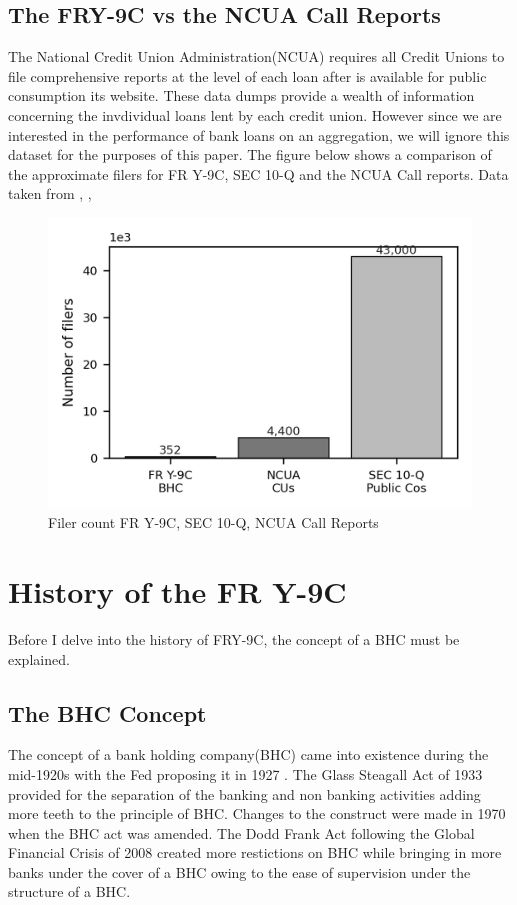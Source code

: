 \documentclass[conference]{IEEEtran}
\begin{document}
\subsection{The FRY-9C vs the NCUA Call Reports}
The National Credit Union Administration(NCUA) requires all Credit Unions to file comprehensive reports at the level of each loan after is available for public consumption its website. These data dumps provide a wealth of information concerning the invdividual loans lent by each credit union.\cite{NCUA} However since we are interested in the performance of bank loans on an aggregation, we will ignore this dataset for the purposes of this paper. The figure below shows a comparison of the approximate filers for FR Y-9C, SEC 10-Q and the NCUA Call reports. Data taken from \cite{9CCount}, \cite{SECCount},\cite{NCUACount}
\begin{figure}[htbp]
	\centerline{\includegraphics{9C Vs 10-Q Vs NCUA Grayscale.png}}
	\caption{Filer count FR Y-9C, SEC 10-Q, NCUA Call Reports}
	\label{fig}
\end{figure}

\section{History of the FR Y-9C}
Before I delve into the history of FRY-9C, the concept of a BHC must be explained.
\subsection{The BHC Concept}
 The concept of a bank holding company(BHC) came into existence during the mid-1920s with the Fed proposing it in 1927 . The Glass Steagall Act of 1933 provided for the separation of the banking and non banking activities adding more teeth to the principle of BHC. Changes to the construct were made in 1970 when the BHC act was amended. The Dodd Frank Act following the Global Financial Crisis of 2008 created more restictions on BHC while bringing in more banks under the cover of a BHC owing to the ease of supervision under the structure of a BHC.\cite{BHC}
\end{document}
